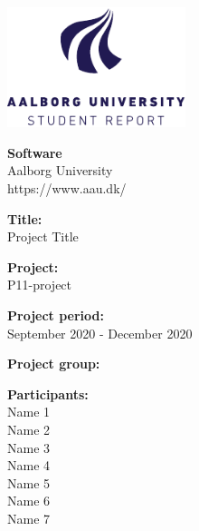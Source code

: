 {}
\thispagestyle{empty}

\begin{singlespace} 
\begin{minipage}[t]{0.48\textwidth}
    \vspace*{-25pt}			%
    \includegraphics[height=3.5cm]{AAUgraphics/aau_logo_en}
    \end{minipage}
    \hfill
    \begin{minipage}[t]{0.48\textwidth} {
        \small 
        \textbf{Software} \\
        Aalborg University \\
        https://www.aau.dk/
    }
\end{minipage}

\vspace*{1cm}

\begin{minipage}[t]{0.48\textwidth}
    \textbf{Title:} \\[5pt]\bigskip\hspace{2ex}
    Project Title
    
    \textbf{Project:} \\[5pt]\bigskip\hspace{2ex}
    P11-project
    
    \textbf{Project period:} \\[5pt]\bigskip\hspace{2ex}
    September 2020 - December 2020
    
    \textbf{Project group:} \\[5pt]\bigskip\hspace{2ex}
    \authorname %
    
    \textbf{Participants:} \\[5pt]\hspace*{2ex}
    Name 1 \\\hspace*{2ex}
    Name 2 \\\hspace*{2ex}
    Name 3 \\\hspace*{2ex}
    Name 4 \\\hspace*{2ex}
    Name 5 \\\hspace*{2ex}
    Name 6 \\\hspace*{2ex}
    Name 7 \\\hspace*{2ex}
    

\end{minipage}
\end{singlespace}
